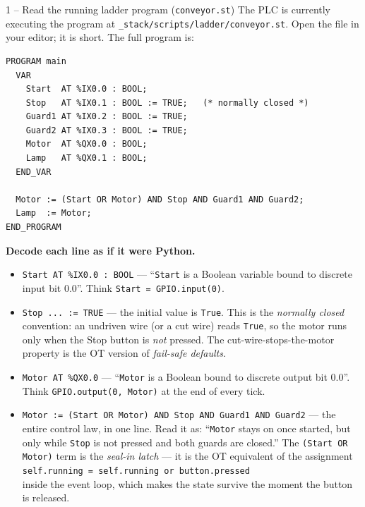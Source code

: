 \documentclass[11pt,a4paper]{article}
\begin{document}
\begin{stepbox}{1 -- Read the running ladder program (\texttt{conveyor.st})}
The PLC is currently executing the program at
\texttt{\_stack/scripts/ladder/}\allowbreak\texttt{conveyor.st}. Open the file in your editor; it is short. The full program is:
\begin{lstlisting}[basicstyle=\ttfamily\footnotesize]
PROGRAM main
  VAR
    Start  AT %IX0.0 : BOOL;
    Stop   AT %IX0.1 : BOOL := TRUE;   (* normally closed *)
    Guard1 AT %IX0.2 : BOOL := TRUE;
    Guard2 AT %IX0.3 : BOOL := TRUE;
    Motor  AT %QX0.0 : BOOL;
    Lamp   AT %QX0.1 : BOOL;
  END_VAR

  Motor := (Start OR Motor) AND Stop AND Guard1 AND Guard2;
  Lamp  := Motor;
END_PROGRAM
\end{lstlisting}

\noindent\textbf{Decode each line as if it were Python.}
\begin{itemize}\setlength{\itemsep}{1pt}
  \item \texttt{Start AT \%IX0.0 : BOOL} --- ``\texttt{Start} is a Boolean variable bound to discrete input bit 0.0''. Think \texttt{Start = GPIO.input(0)}.
  \item \texttt{Stop ... := TRUE} --- the initial value is \texttt{True}. This is the \emph{normally closed} convention: an undriven wire (or a cut wire) reads \texttt{True}, so the motor runs only when the Stop button is \emph{not} pressed. The cut-wire-stops-the-motor property is the OT version of \emph{fail-safe defaults}.
  \item \texttt{Motor AT \%QX0.0} --- ``\texttt{Motor} is a Boolean bound to discrete output bit 0.0''. Think \texttt{GPIO.output(0, Motor)} at the end of every tick.
  \item \texttt{Motor := (Start OR Motor) AND Stop AND Guard1 AND Guard2} --- the entire control law, in one line. Read it as: ``\texttt{Motor} stays on once started, but only while \texttt{Stop} is not pressed and both guards are closed.'' The \texttt{(Start OR Motor)} term is the \emph{seal-in latch} --- it is the OT equivalent of the assignment\\
  \hbox{}\quad\texttt{self.running = self.running or button.pressed}\\
  inside the event loop, which makes the state survive the moment the button is released.
\end{itemize}


\end{stepbox}
\end{document}
